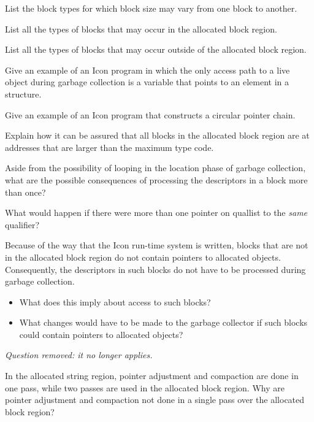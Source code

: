  List the block types for which block size may
vary from one block to another.

 List all the types of blocks that may occur in
the allocated block region.

 List all the types of blocks that may occur
outside of the allocated block region.

 Give an example of an Icon program in which the
only access path to a live object during garbage collection is a
variable that points to an element in a structure.

 Give an example of an Icon program that
constructs a circular pointer chain.

 Explain how it can be assured that all blocks in
the allocated block region are at addresses that are larger than the
maximum type code.

 Aside from the possibility of looping in the
location phase of garbage collection, what are the possible
consequences of processing the descriptors in a block more than once?

 What would happen if there were more than one
pointer on quallist to the \textit{same} qualifier?

 Because of the way that the Icon run-time system
is written, blocks that are not in the allocated block region do not
contain pointers to allocated objects. Consequently, the descriptors
in such blocks do not have to be processed during garbage collection.

\begin{itemize}
\item What does this imply about access to such blocks?

\item What changes would have to be made to the garbage collector if
such blocks could contain pointers to allocated objects?

\end{itemize}

{\em Question removed: it no longer applies.}

 In the allocated string region, pointer
adjustment and compaction are done in one pass, while two passes are
used in the allocated block region. Why are pointer adjustment and
compaction not done in a single pass over the allocated block region?

